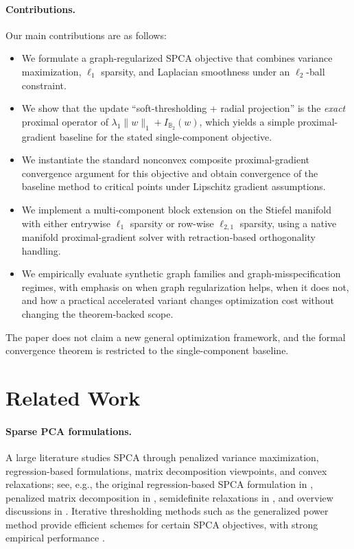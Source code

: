 \documentclass[10pt,twocolumn,letterpaper]{article}
\theoremstyle{definition}
\begin{document}
\paragraph{Contributions.}
Our main contributions are as follows:
\begin{itemize}[leftmargin=*]
  \item We formulate a graph-regularized SPCA objective that combines variance maximization, $\ell_1$ sparsity, and Laplacian smoothness under an $\ell_2$-ball constraint.
  \item We show that the update ``soft-thresholding + radial projection'' is the \emph{exact} proximal operator of $\lambda_1\|w\|_1 + I_{\mathbb{B}_2}(w)$, which yields a simple proximal-gradient baseline for the stated single-component objective.
  \item We instantiate the standard nonconvex composite proximal-gradient convergence argument for this objective and obtain convergence of the baseline method to critical points under Lipschitz gradient assumptions.
  \item We implement a multi-component block extension on the Stiefel manifold with either entrywise $\ell_1$ sparsity or row-wise $\ell_{2,1}$ sparsity, using a native manifold proximal-gradient solver with retraction-based orthogonality handling.
  \item We empirically evaluate synthetic graph families and graph-misspecification regimes, with emphasis on when graph regularization helps, when it does not, and how a practical accelerated variant changes optimization cost without changing the theorem-backed scope.
\end{itemize}
The paper does not claim a new general optimization framework, and the formal convergence theorem is restricted to the single-component baseline.

\section{Related Work}
\paragraph{Sparse PCA formulations.}
A large literature studies SPCA through penalized variance maximization, regression-based formulations, matrix decomposition viewpoints, and convex relaxations; see, e.g., the original regression-based SPCA formulation in \cite{zou2006spca}, penalized matrix decomposition in \cite{witten2009pmd}, semidefinite relaxations in \cite{daspremont2007dspca}, and overview discussions in \cite{zou2018overviewSPCA}. Iterative thresholding methods such as the generalized power method provide efficient schemes for certain SPCA objectives, with strong empirical performance \cite{journee2010gpower}.
\end{document}
